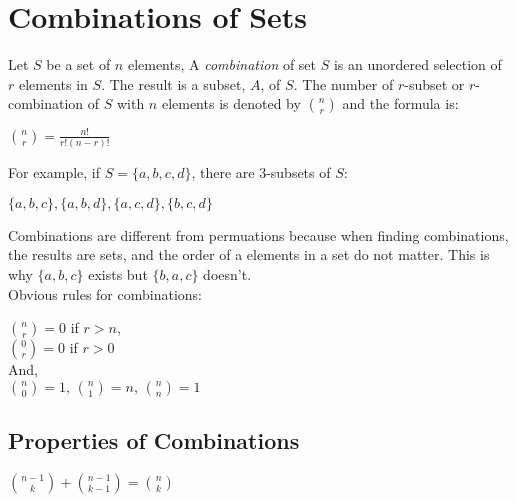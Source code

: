 \documentclass[12pt, letterpaper]{article}
\begin{document}
 
\maketitle

\section*{Combinations of Sets}

Let \(S\) be a set of \(n\) elements, A \textit{combination} of set \(S\) is an unordered selection 
of \(r\) elements in \(S\). The result is a subset, \(A\), of \(S\). The number of \(r\)-subset or \(r\)-combination
of \(S\) with \(n\) elements is denoted by \(\binom{n}{r}\) and the formula is: 

\begin{center}
  \(\binom{n}{r} = \frac{n!}{r!(n-r)!}\)
\end{center}

\noindent For example, if \(S = \{a, b, c, d\}\), there are 3-subsets of \(S\): 

\begin{center}
  \(
    \{a, b, c\}, \{a, b, d\}, \{a, c, d\}, \{b, c, d\}
  \)
\end{center}

\noindent Combinations are different from permuations because when finding combinations, the results are sets, and the order of a elements in a set do not matter. This is why \(\{a, b, c\}\) exists but \(\{b, a, c\}\) doesn't. \\

\noindent Obvious rules for combinations:

\begin{center}
  \( \binom{n}{r} = 0 \) if \(r > n\), \\
  \( \binom{0}{r} = 0 \) if \(r > 0\) \\
  And, \\
  \( \binom{n}{0} = 1,\, \binom{n}{1}=n,\, \binom{n}{n} = 1\)
\end{center}

\subsection*{Properties of Combinations}

\begin{center}
  \( \binom{n-1}{k} + \binom{n-1}{k-1} = \binom{n}{k} \)
\end{center}

\pagebreak
\end{document}
